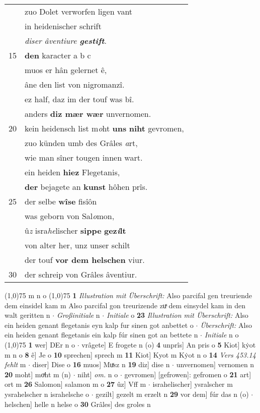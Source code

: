 \documentclass[8pt,a4paper,notitlepage]{article}
\begin{document}
\begin{table}[ht]
\begin{minipage}[t]{0.5\linewidth}
\begin{tabular}{rl}
 & zuo Dolet verworfen ligen vant\\ 
 & in heidenischer schrift\\ 
 & \textit{diser âventiure \textbf{gestift}}.\\ 
15 & \textbf{den} karacter a b c\\ 
 & muos er hân gelernet ê,\\ 
 & âne den list von nigromanzî.\\ 
 & ez half, daz im der touf was bî.\\ 
 & anders \textbf{diz mær wær} unvernomen.\\ 
20 & kein heidensch list m\textit{o}ht \textbf{uns} \textbf{niht} gevromen,\\ 
 & zuo künden umb des Grâles \textit{a}rt,\\ 
 & wie man sîner tougen innen wart.\\ 
 & ein heiden \textbf{hiez} Flegetanis,\\ 
 & \textbf{der} bejagete an \textbf{kunst} hôhen prîs.\\ 
25 & der selbe \textbf{wîse} fisîôn\\ 
 & was geborn von Sal\textit{o}mon,\\ 
 & û\textit{z} isra\textit{he}lischer \textbf{sippe} \textbf{gez\textit{i}lt}\\ 
 & von alter her, unz unser schilt\\ 
 & der touf  \textbf{vor dem helschen} viur.\\ 
30 & der schreip von Grâles âventiur.\\ 
\end{tabular}
\scriptsize
\line(1,0){75} \newline
m n o \newline
\line(1,0){75} \newline
\textbf{1} \textit{Illustration mit Überschrift:} Also parcifal gen treuriende dem einsidel kam m  Also parcifal gon treurizende zuͯ dem einsydel kam in den walt geritten n   $\cdot$ \textit{Großinitiale} n   $\cdot$ \textit{Initiale} o  \textbf{23} \textit{Illustration mit Überschrift:} Also ein heiden genant flegetanis eyn kalp fur sinen got anbettet o   $\cdot$ \textit{Überschrift:} Also ein heiden genant flegetanis ein kalp fúr sinen got an bettete n   $\cdot$ \textit{Initiale} n o  \newline
\line(1,0){75} \newline
\textbf{1} wer] DEr n o  $\cdot$ vrâgete] E frogete n (o) \textbf{4} unprîs] An pris o \textbf{5} Kiot] kẏot m n o \textbf{8} ê] Je o \textbf{10} sprechen] sprech m \textbf{11} Kiot] Kyot m Kẏot n o \textbf{14} \textit{Vers 453.14 fehlt} m   $\cdot$ diser] Dise o \textbf{16} muos] Muͯsz n \textbf{19} diz] dise n  $\cdot$ unvernomen] vernomen n \textbf{20} moht] moͯht m (n)  $\cdot$ niht] \textit{om.} n o  $\cdot$ gevromen] [gefrowen]: gefromen o \textbf{21} art] ort m \textbf{26} Salomon] salamon m o \textbf{27} ûz] Vff m  $\cdot$ israhelischer] ysralscher m ysrahelscher n israhelsche o  $\cdot$ gezilt] gezelt m erzelt n \textbf{29} vor dem] fúr das n (o)  $\cdot$ helschen] helle n helse o \textbf{30} Grâles] des groles n \newline

\end{minipage}
\end{table}
\end{document}
